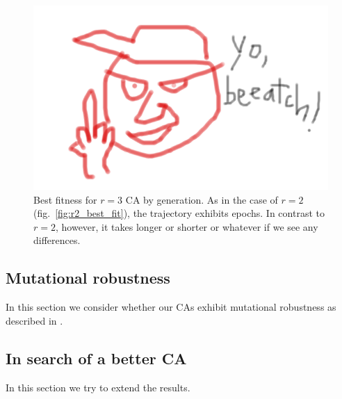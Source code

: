 \begin{figure} [h]
\begin{center}
\includegraphics[width=\linewidth]{foo.png}
\caption{Best fitness for $r = 3$ CA by generation. As in the case of $r = 2$ (fig.~\ref{fig:r2_best_fit}), the trajectory exhibits epochs. In contrast to $r = 2$, 
however, it takes longer or shorter or whatever if we see any differences.}
\label{fig:r3_best_fit}
\end{center}
\end{figure}



\subsection{Mutational robustness} \label{sec:2_2}

In this section we consider whether our CAs exhibit mutational robustness as described in \cite{wagner_role_2012}.

\subsection{In search of a better CA} \label{sec:2_3}

In this section we try to extend the results.



